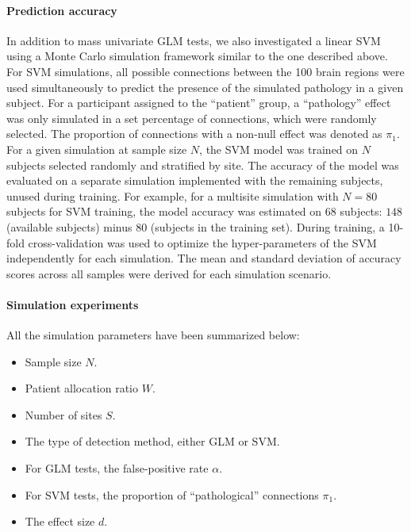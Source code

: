 \documentclass[authoryear]{elsarticle}
\begin{document}

\paragraph{Prediction accuracy}
In addition to mass univariate GLM tests, we also investigated a linear SVM
\citep{Cortes1995} using a Monte Carlo simulation framework similar to the one
described above. For SVM simulations, all possible connections between the 100
brain regions were used simultaneously to predict the presence of the simulated
pathology in a given subject. For a participant assigned to the ``patient''
group, a ``pathology'' effect was only simulated in a set percentage of
connections, which were randomly selected. The proportion of connections with a
non-null effect was denoted as $\pi_1$. For a given simulation at sample size
$N$, the SVM model was trained on $N$ subjects selected randomly and stratified
by site. The accuracy of the model was evaluated on a separate simulation
implemented with the remaining subjects, unused during training. For example,
for a multisite simulation with $N=80$ subjects for SVM training, the model
accuracy was estimated on $68$ subjects: $148$ (available subjects) minus $80$
(subjects in the training set). During training, a 10-fold cross-validation was
used to optimize the hyper-parameters of the SVM independently for each
simulation. The mean and standard deviation of accuracy scores across all
samples were derived for each simulation scenario.

\paragraph{Simulation experiments}

All the simulation parameters have been summarized below: 
\begin{itemize}
 \item Sample size $N$. 
 \item Patient allocation ratio $W$. 
 \item Number of sites $S$. 
 \item The type of detection method, either GLM or SVM. 
 \item For GLM tests, the false-positive rate $\alpha$. 
 \item For SVM tests, the proportion of ``pathological'' connections $\pi_1$.
 \item The effect size $d$. 
\end{itemize}
\end{document}
